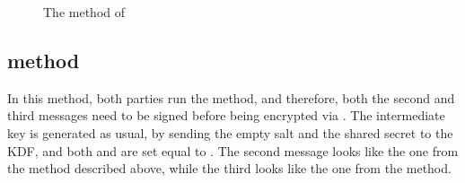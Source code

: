 \begin{figure}[!h]
{}
\caption{The \mStatSig{} method of \mEdhoc}
\label{fig:edhocstatsig}
\end{figure}

\subsection{\mSigSig{} method}
In this method, both parties run the \mSig{} method, and therefore, both the
second and third messages need to be signed before being encrypted via \mAead.
The intermediate key \mPRKtwo{} is generated as usual, by sending the empty salt
and the shared secret to the KDF, and both \mPRKthree{} and \mPRKfour{} are set equal to \mPRKtwo. The second message looks like the one from the \mSigStat{} method described above, while the third looks like the one from the \mStatSig{} method.

